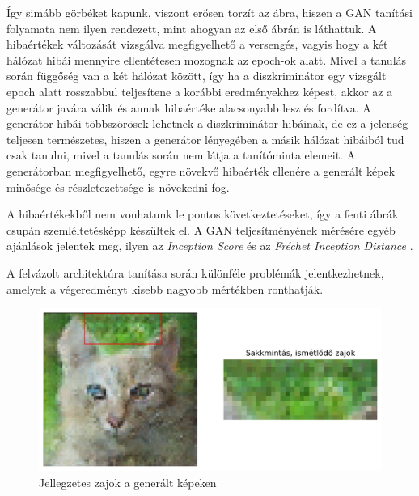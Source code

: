 Így simább görbéket kapunk, viszont erősen torzít az ábra, hiszen a GAN tanítási folyamata nem ilyen rendezett, mint ahogyan az első ábrán is láthattuk.
A hibaértékek változását vizsgálva megfigyelhető a versengés, vagyis hogy a két hálózat hibái mennyire ellentétesen mozognak az epoch-ok alatt. Mivel a tanulás során függőség van a két hálózat között, így ha a diszkriminátor egy vizsgált epoch alatt rosszabbul teljesítene a korábbi eredményekhez képest, akkor az a generátor javára válik és annak hibaértéke alacsonyabb lesz és fordítva. A generátor hibái többszörösek lehetnek a diszkriminátor hibáinak, de ez a jelenség teljesen természetes, hiszen a generátor lényegében a másik hálózat hibáiból tud csak tanulni, mivel a tanulás során nem látja a tanítóminta elemeit. A generátorban megfigyelhető, egyre növekvő hibaérték ellenére a generált képek minősége és részletezettsége is növekedni fog.

A hibaértékekből nem vonhatunk le pontos következtetéseket, így a fenti ábrák csupán szemléltetésképp készültek el. A GAN teljesítményének mérésére egyéb ajánlások jelentek meg, ilyen az \textit{Inception Score} \cite{salimans2016improved} és az \textit{Fréchet Inception Distance} \cite{heusel2017gans}.


A felvázolt architektúra tanítása során különféle problémák jelentkezhetnek, amelyek a végeredményt kisebb nagyobb mértékben ronthatják.

\begin{figure}[h]
	\centering
	\includegraphics[width=13cm]{images/chessboard-patterns.png}
	\caption{Jellegzetes zajok a generált képeken}
	\label{fig:chessboard-patterns}
\end{figure}


